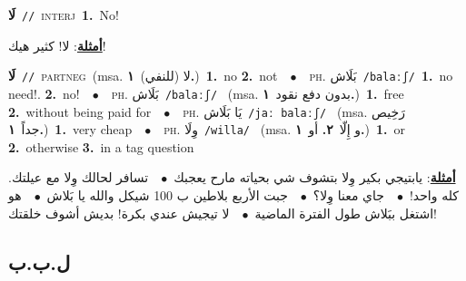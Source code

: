 \documentclass[10pt,a4paper,twoside]{article} %
\begin{document}
\begin{multicols}{2}
{{{\setlength\topsep{0pt}\textbf{\foreignlanguage{arabic}{لَا}}\ {\color{gray}\texttt{//}\color{black}}\ \textsc{interj}\ \textbf{1.}~No!\  \begin{flushright}\color{gray}\foreignlanguage{arabic}{\textbf{\underline{\foreignlanguage{arabic}{أمثلة}}}: لا! كثير هيك!}\end{flushright}\color{black}} \vspace{2mm}

{\setlength\topsep{0pt}\textbf{\foreignlanguage{arabic}{لَا}}\ {\color{gray}\texttt{//}\color{black}}\ \textsc{part\textunderscore neg}\ \color{gray}(msa. \foreignlanguage{arabic}{لا (للنفي)}~\foreignlanguage{arabic}{\textbf{١.}})\color{black}\ \textbf{1.}~no  \textbf{2.}~not\ \ $\bullet$\ \ \textsc{ph.} \color{gray} \foreignlanguage{arabic}{بَلَاش}\color{black}\ {\color{gray}\texttt{/{\sffamily balaːʃ}/}\color{black}}\ \textbf{1.}~no need!.  \textbf{2.}~no!\ \ $\bullet$\ \ \textsc{ph.} \color{gray} \foreignlanguage{arabic}{بَلَاش}\color{black}\ {\color{gray}\texttt{/{\sffamily balaːʃ}/}\color{black}}\ \color{gray} (msa. \foreignlanguage{arabic}{بدون دفع نقود}~\foreignlanguage{arabic}{\textbf{١.}})\color{black}\ \textbf{1.}~free  \textbf{2.}~without being paid for\ \ $\bullet$\ \ \textsc{ph.} \color{gray} \foreignlanguage{arabic}{يَا بَلَاش}\color{black}\ {\color{gray}\texttt{/{\sffamily jaː balaːʃ}/}\color{black}}\ \color{gray} (msa. \foreignlanguage{arabic}{رَخِيص جداً}~\foreignlanguage{arabic}{\textbf{١.}})\color{black}\ \textbf{1.}~very cheap\ \ $\bullet$\ \ \textsc{ph.} \color{gray} \foreignlanguage{arabic}{وِلَا}\color{black}\ {\color{gray}\texttt{/{\sffamily willa}/}\color{black}}\ \color{gray} (msa. \foreignlanguage{arabic}{و إِلّا}~\foreignlanguage{arabic}{\textbf{٢.}}  \foreignlanguage{arabic}{أو}~\foreignlanguage{arabic}{\textbf{١.}})\color{black}\ \textbf{1.}~or  \textbf{2.}~otherwise  \textbf{3.}~in a tag question\  \begin{flushright}\color{gray}\foreignlanguage{arabic}{\textbf{\underline{\foreignlanguage{arabic}{أمثلة}}}:  يابتيجي بكير وِلا بتشوف شي بحياته مارح يعجبك\ $\bullet$\ \  تسافر لحالك وِلا مع عيلتك. كله واحد!\ $\bullet$\ \  جاي معنا وِلا؟\ $\bullet$\ \  جبت الأربع بلاطين ب 100 شيكل والله يا بَلاش\ $\bullet$\ \  هو اشتغل ببَلاش طول الفترة الماضية\ $\bullet$\ \  لا تيجيش عندي بكرة! بديش أشوف خلقتك!}\end{flushright}\color{black}} \vspace{2mm}

\vspace{-3mm}
\subsection*{\color{blue}\foreignlanguage{arabic}{ل.ب.ب}\color{blue}{}} 

}}
\end{multicols}
\end{document}
